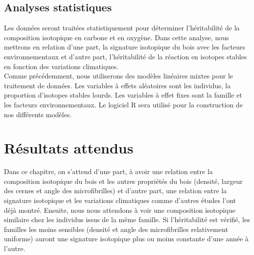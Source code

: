 \documentclass{report}
\begin{document}



\subsection*{Analyses statistiques}
Les données seront traitées statistiquement pour déterminer l'héritabilité de la composition isotopique en carbone et en oxygène. Dans cette analyse, nous mettrons en relation d'une part, la signature isotopique du bois avec les facteurs environnementaux et d'autre part, l'héritabilité de la réaction en isotopes stables en fonction des variations climatiques. \\

Comme précédemment,  nous utiliserons des modèles linéaires mixtes pour le traitement de données. Les variables à effets aléatoires sont les individus, la proportion d'isotopes stables lourds. Les variables à effet fixes sont la famille et les facteurs environnementaux. Le logiciel R sera utilisé pour la construction de nos différents modèles. 

\section*{Résultats attendus}

Dans ce chapitre, on s'attend d'une part, à avoir une relation entre la composition isotopique du bois et les autres propriétés du bois (densité, largeur des cernes et angle des microfibrilles) et d'autre part, une relation entre la signature isotopique et les variations climatiques comme d'autres études l'ont déjà montré. Ensuite, nous nous attendons à voir une composition isotopique similaire chez les individus issus de la même famille. Si l'héritabilité est vérifié, les familles les moins sensibles (densité et angle des microfibrilles relativement uniforme) auront une signature isotopique plus ou moins constante d'une année à l'autre. 
\end{document}
